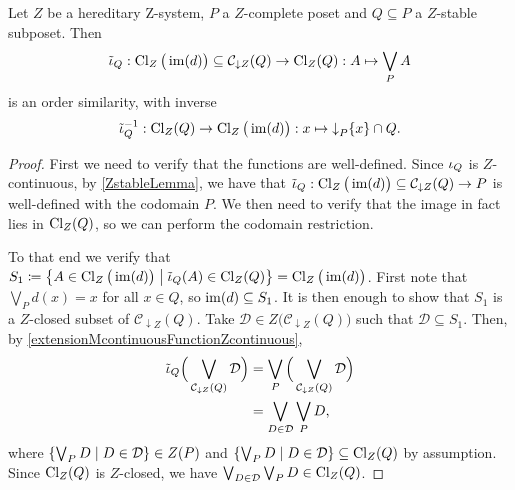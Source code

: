 \begin{lemma} \label{ZclosureSimilarToIntersectionSystem}
Let $Z$ be a hereditary $\mathrm{Z}$-system, $P$ a $Z$-complete poset and $Q \subseteq P$ a $Z$-stable subposet. Then
\[ \tilde{\operatorname{\iota}}_Q: \operatorname{Cl}_Z\big(\operatorname{im}(d)\big) \subseteq \mathcal{C}_{\downarrow Z}(Q) \to \operatorname{Cl}_Z(Q): A \mapsto \bigvee_P A \]
is an order similarity, with inverse
\[ \tilde{\operatorname{\iota}}_Q^{-1}: \operatorname{Cl}_Z(Q) \to \operatorname{Cl}_Z\big(\operatorname{im}(d)\big): x\mapsto \operatorname{\downarrow}_P\{x\} \cap Q. \]
\end{lemma}
\begin{proof}
First we need to verify that the functions are well-defined. Since $\operatorname{\iota}_Q$ is $Z$-continuous, by \ref{ZstableLemma}, we have that $\tilde{\operatorname{\iota}}_Q: \operatorname{Cl}_Z\big(\operatorname{im}(d)\big) \subseteq \mathcal{C}_{\downarrow Z}(Q) \to P$ is well-defined with the codomain $P$. We then need to verify that the image in fact lies in $\operatorname{Cl}_Z(Q)$, so we can perform the codomain restriction.

To that end we verify that $S_1 \defeq \setbuilder{A \in \Closure_Z\big(\im(d)\big)}{\tilde{\incl}_Q(A) \in \Closure_Z(Q)} = \Closure_Z\big(\im(d)\big)$. First note that $\bigvee_P d(x) = x$ for all $x\in Q$, so $\operatorname{im}(d) \subseteq S_1$. It is then enough to show that $S_1$ is a $Z$-closed subset of $\mathcal{C}_{\downarrow Z}(Q)$. Take $\mathcal{D} \in Z\big(\mathcal{C}_{\downarrow Z}(Q)\big)$ such that $\mathcal{D} \subseteq S_1$. Then, by \ref{extensionMcontinuousFunctionZcontinuous},
\begin{align*}
\tilde{\operatorname{\iota}}_Q\Big(\bigvee_{\mathcal{C}_{\downarrow Z}(Q)} \mathcal{D}\Big) &= \bigvee_P\Big(\bigvee_{\mathcal{C}_{\downarrow Z}(Q)} \mathcal{D}\Big) \\
&= \bigvee_{D\in \mathcal{D}}\bigvee_{P}D,
\end{align*}
where $\setbuilder{\bigvee_{P}D}{D\in \mathcal{D}} \in Z(P)$ and $\setbuilder{\bigvee_{P}D}{D\in \mathcal{D}} \subseteq \Closure_Z(Q)$ by assumption. Since $\operatorname{Cl}_Z(Q)$ is $Z$-closed, we have $\bigvee_{D\in \mathcal{D}}\bigvee_{P}D \in \operatorname{Cl}_Z(Q)$.


\end{proof}
